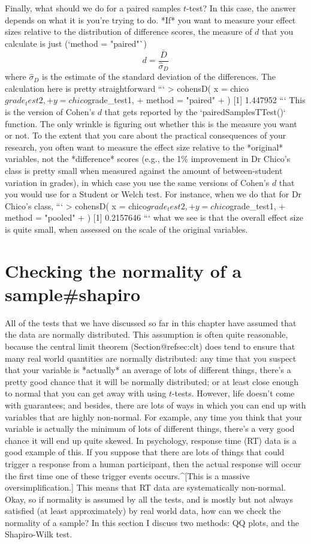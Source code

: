 Finally, what should we do for a paired samples $t$-test? In this case, the answer depends on what it is you're trying to do. *If* you want to measure your effect sizes relative to the distribution of difference scores, the measure of $d$ that you calculate is just (`method = "paired"`)
$$
d = \frac{\bar{D}}{\hat{\sigma}_D}
$$
where $\hat{\sigma}_D$ is the estimate of the standard deviation of the differences. The calculation here is pretty straightforward
```
> cohensD( x = chico$grade_test2, 
+          y = chico$grade_test1,
+          method = "paired" 
+ )
[1] 1.447952
```
This is the version of Cohen's $d$ that gets reported by the `pairedSamplesTTest()` function. The only wrinkle is figuring out whether this is the measure you want or not. To the extent that you care about the practical consequences of your research, you often want to measure the effect size relative to the *original* variables, not the *difference* scores (e.g., the 1\% improvement in Dr Chico's class is pretty small when measured against the amount of between-student variation in grades), in which case you use the same versions of Cohen's $d$ that you would use for a Student or Welch test. For instance, when we do that for Dr Chico's class, 
```
> cohensD( x = chico$grade_test2, 
+          y = chico$grade_test1,
+          method = "pooled" 
+ )
[1] 0.2157646
```
what we see is that the overall effect size is quite small, when assessed on the scale of the original variables.






\section{Checking the normality of a sample{#shapiro}}

All of the tests that we have discussed so far in this chapter have assumed that the data are normally distributed. This assumption is often quite reasonable, because the central limit theorem (Section@refsec:clt) does tend to ensure that many real world quantities are normally distributed: any time that you suspect that your variable is *actually* an average of lots of different things, there's a pretty good chance that it will be normally distributed; or at least close enough to normal that you can get away with using $t$-tests. However, life doesn't come with guarantees; and besides, there are lots of ways in which you can end up with variables that are highly non-normal. For example, any time you think that your variable is actually the minimum of lots of different things, there's a very good chance it will end up quite skewed. In psychology, response time (RT) data is a good example of this. If you suppose that there are lots of things that could trigger a response from a human participant, then the actual response will occur the first time one of these trigger events occurs.^[This is a massive oversimplification.] This means that RT data are systematically non-normal.  Okay, so if normality is assumed by all the tests, and is mostly but not always satisfied (at least approximately) by real world data, how can we check the normality of a sample? In this section I discuss two methods: QQ plots, and the Shapiro-Wilk test.

